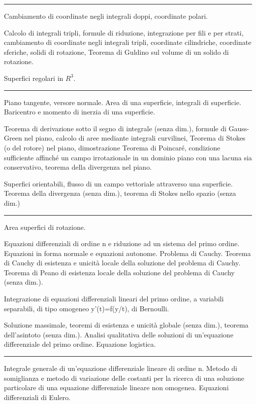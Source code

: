 \documentclass[a4paper,10pt]{article} %
\begin{document}
\begin{multicols}{2}
\bigbreak
\hrule
\bigbreak



Cambiamento di coordinate negli integrali doppi, coordinate polari.

Calcolo di integrali tripli, formule di riduzione, integrazione per fili e per strati, cambiamento di coordinate negli integrali tripli, coordinate cilindriche, coordinate sferiche, solidi di rotazione, Teorema di Guldino sul volume di un solido di rotazione.

Superfici regolari in $R^3$.





\bigbreak
\hrule
\bigbreak








Piano tangente, versore normale. Area di una superficie, integrali di superficie. Baricentro e momento di inerzia di una superficie.

Teorema di derivazione sotto il segno di integrale (senza dim.), formule di Gauss-Green nel piano, calcolo di aree mediante integrali curvilinei, Teorema di Stokes (o del rotore) nel piano, dimostrazione Teorema di Poincaré, condizione sufficiente affinché un campo irrotazionale in un dominio piano con una lacuna sia conservativo, teorema della divergenza nel piano.

Superfici orientabili, flusso di un campo vettoriale attraverso una superficie. Teorema della divergenza (senza dim.), teorema di Stokes nello spazio (senza dim.)







\bigbreak
\hrule
\bigbreak


Area superfici di rotazione.

Equazioni differenziali di ordine n e riduzione ad un sistema del primo ordine. Equazioni in forma normale e equazioni autonome. Problema di Cauchy. Teorema di Cauchy di esistenza e unicità locale della soluzione del problema di Cauchy. Teorema di Peano di esistenza locale della soluzione del  problema di Cauchy (senza dim.). 

Integrazione di equazioni differenziali lineari del primo ordine,  a variabili separabili,  di tipo omogeneo y’(t)=f(y/t), di Bernoulli.

Soluzione massimale, teoremi di esistenza e unicità globale (senza dim.), teorema dell'asintoto (senza dim.). Analisi qualitativa delle soluzioni di un'equazione differenziale del primo ordine. Equazione logistica.






\bigbreak
\hrule
\bigbreak



Integrale generale di un'equazione differenziale lineare di ordine n. Metodo di somiglianza e metodo di variazione delle costanti per la ricerca di una soluzione particolare di una equazione differenziale lineare non omogenea. Equazioni differenziali di Eulero.

\end{multicols}
\end{document}
